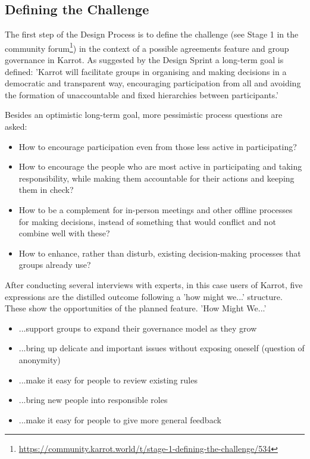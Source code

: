 \documentclass[
	a4paper,%
	11pt,%
	]{article}
\begin{document}
\subsection{Defining the Challenge}\label{subsec:challenge}

The first step of the Design Process is to define the challenge (see Stage 1 in the community forum\footnote{\label{url:1challenge}\url{https://community.karrot.world/t/stage-1-defining-the-challenge/534}}) in the context of a possible agreements feature and group governance in Karrot. As suggested by the Design Sprint a long-term goal is defined: 'Karrot will facilitate groups in organising and making decisions in a democratic and transparent way, encouraging participation from all and avoiding the formation of unaccountable and fixed hierarchies between participants.'

Besides an optimistic long-term goal, more pessimistic process questions are asked:
\begin{itemize}
	\item How to encourage participation even from those less active in participating?
	\item How to encourage the people who are most active in participating and taking responsibility, while making them accountable for their actions and keeping them in check?
	\item How to be a complement for in-person meetings and other offline processes for making decisions, instead of something that would conflict and not combine well with these?
	\item How to enhance, rather than disturb, existing decision-making processes that groups already use?
\end{itemize}

After conducting several interviews with experts, in this case users of Karrot, five expressions are the distilled outcome following a 'how might we...' structure. These show the opportunities of the planned feature. 'How Might We...'
\begin{itemize}
	\item ...support groups to expand their governance model as they grow
	\item ...bring up delicate and important issues without exposing oneself (question of anonymity)
	\item ...make it easy for people to review existing rules
	\item ...bring new people into responsible roles
	\item ...make it easy for people to give more general feedback
\end{itemize}
\end{document}
